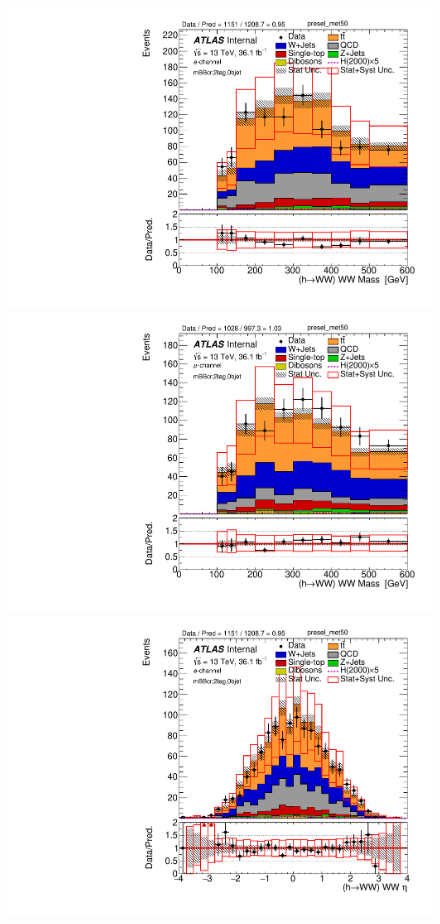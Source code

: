 \begin{figure}[!h]
\begin{center}
\includegraphics[scale=0.33]{./figures/boosted/PlotByChannels/DataMC_2tag_0bjet_mbbcr_elec_presel_met50_WWMass}                                                                                     
\includegraphics[scale=0.33]{./figures/boosted/PlotByChannels/DataMC_2tag_0bjet_mbbcr_muon_presel_met50_WWMass}                                                                                     
\includegraphics[scale=0.33]{./figures/boosted/PlotByChannels/DataMC_2tag_0bjet_mbbcr_elec_presel_met50_WWEta}                                                                                      

\end{center}
\end{figure}

